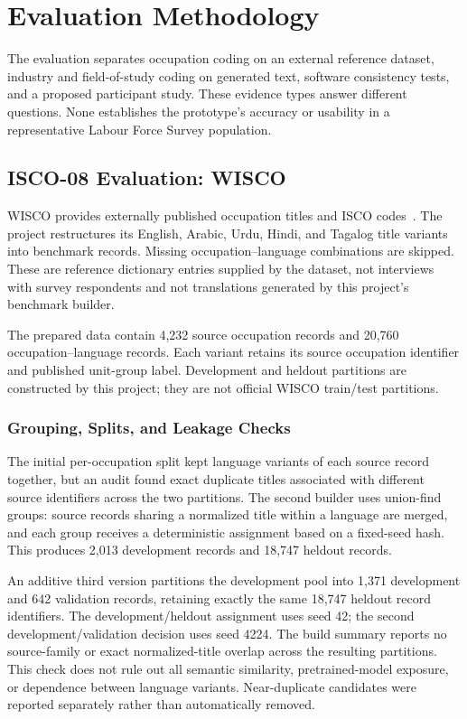 \chapter{Evaluation Methodology}
\label{chap:evaluation}

The evaluation separates occupation coding on an external reference
dataset, industry and field-of-study coding on generated text, software
consistency tests, and a proposed participant study. These evidence types
answer different questions. None establishes the prototype's accuracy or
usability in a representative Labour Force Survey population.

\section{ISCO-08 Evaluation: WISCO}
\label{sec:eval-wisco}

WISCO provides externally published occupation titles and ISCO
codes~\cite{wisco2023}. The project restructures its English, Arabic, Urdu,
Hindi, and Tagalog title variants into benchmark records. Missing
occupation--language combinations are skipped. These are reference
dictionary entries supplied by the dataset, not interviews with survey
respondents and not translations generated by this project's benchmark
builder.

The prepared data contain 4,232 source occupation records and 20,760
occupation--language records. Each variant retains its source occupation
identifier and published unit-group label. Development and heldout
partitions are constructed by this project; they are not official WISCO
train/test partitions.

\subsection{Grouping, Splits, and Leakage Checks}

The initial per-occupation split kept language variants of each source
record together, but an audit found exact duplicate titles associated
with different source identifiers across the two partitions. The second
builder uses union-find groups: source records sharing a normalized title
within a language are merged, and each group receives a deterministic
assignment based on a fixed-seed hash. This produces 2,013 development
records and 18,747 heldout records.

An additive third version partitions the development pool into 1,371
development and 642 validation records, retaining exactly the same
18,747 heldout record identifiers. The development/heldout assignment
uses seed 42; the second development/validation decision uses seed 4224.
The build summary reports no source-family or exact normalized-title
overlap across the resulting partitions. This check does not rule out
all semantic similarity, pretrained-model exposure, or dependence between
language variants. Near-duplicate candidates were reported separately
rather than automatically removed.

